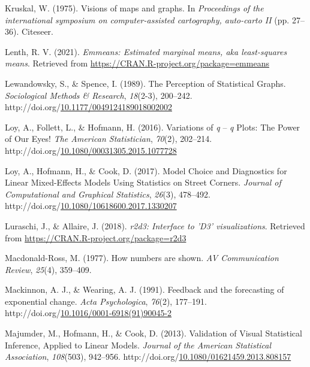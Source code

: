 \documentclass[print]{nuthesis}
\newlength{\cslhangindent}
\newenvironment{CSLReferences}%
{\setlength{\parindent}{0pt}%
\everypar{\setlength{\hangindent}{\cslhangindent}}\ignorespaces}%
{\par}
\begin{document}
\begin{CSLReferences}{1}{0}
\leavevmode\hypertarget{ref-kruskal1975visions}{}%
Kruskal, W. (1975). Visions of maps and graphs. In \emph{Proceedings of the international symposium on computer-assisted cartography, auto-carto II} (pp. 27--36). Citeseer.

\leavevmode\hypertarget{ref-emmeans}{}%
Lenth, R. V. (2021). \emph{Emmeans: Estimated marginal means, aka least-squares means}. Retrieved from \url{https://CRAN.R-project.org/package=emmeans}

\leavevmode\hypertarget{ref-lewandowsky_perception_1989}{}%
Lewandowsky, S., \& Spence, I. (1989). The {Perception} of {Statistical} {Graphs}. \emph{Sociological Methods \& Research}, \emph{18}(2-3), 200--242. http://doi.org/\href{https://doi.org/10.1177/0049124189018002002}{10.1177/0049124189018002002}

\leavevmode\hypertarget{ref-loy_variations_2016}{}%
Loy, A., Follett, L., \& Hofmann, H. (2016). Variations of \emph{q} -- \emph{q} {Plots}: {The} {Power} of {Our} {Eyes}! \emph{The American Statistician}, \emph{70}(2), 202--214. http://doi.org/\href{https://doi.org/10.1080/00031305.2015.1077728}{10.1080/00031305.2015.1077728}

\leavevmode\hypertarget{ref-loy_model_2017}{}%
Loy, A., Hofmann, H., \& Cook, D. (2017). Model {Choice} and {Diagnostics} for {Linear} {Mixed}-{Effects} {Models} {Using} {Statistics} on {Street} {Corners}. \emph{Journal of Computational and Graphical Statistics}, \emph{26}(3), 478--492. http://doi.org/\href{https://doi.org/10.1080/10618600.2017.1330207}{10.1080/10618600.2017.1330207}

\leavevmode\hypertarget{ref-r2d3}{}%
Luraschi, J., \& Allaire, J. (2018). \emph{r2d3: Interface to 'D3' visualizations}. Retrieved from \url{https://CRAN.R-project.org/package=r2d3}

\leavevmode\hypertarget{ref-macdonald1977numbers}{}%
Macdonald-Ross, M. (1977). How numbers are shown. \emph{AV Communication Review}, \emph{25}(4), 359--409.

\leavevmode\hypertarget{ref-mackinnon_feedback_1991}{}%
Mackinnon, A. J., \& Wearing, A. J. (1991). Feedback and the forecasting of exponential change. \emph{Acta Psychologica}, \emph{76}(2), 177--191. http://doi.org/\href{https://doi.org/10.1016/0001-6918(91)90045-2}{10.1016/0001-6918(91)90045-2}

\leavevmode\hypertarget{ref-majumder_validation_2013}{}%
Majumder, M., Hofmann, H., \& Cook, D. (2013). Validation of {Visual} {Statistical} {Inference}, {Applied} to {Linear} {Models}. \emph{Journal of the American Statistical Association}, \emph{108}(503), 942--956. http://doi.org/\href{https://doi.org/10.1080/01621459.2013.808157}{10.1080/01621459.2013.808157}


\end{CSLReferences}
\end{document}
